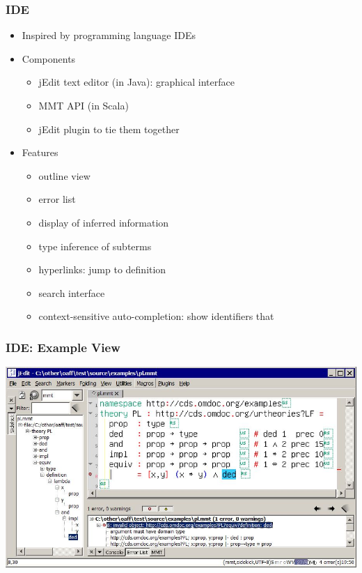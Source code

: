 \documentclass{beamer}
\begin{document}
\begin{frame}\frametitle{IDE}
 \begin{itemize}
   \item Inspired by programming language IDEs
   \item Components
     \begin{itemize}
       \item jEdit text editor (in Java): graphical interface
       \item MMT API (in Scala)
       \item jEdit plugin to tie them together
     \end{itemize}
   \item Features
     \begin{itemize}
       \item outline view
       \item error list
       \item display of inferred information
       \item type inference of subterms
       \item hyperlinks: jump to definition
       \item search interface
       \item context-sensitive auto-completion: show identifiers that
     \end{itemize}
\end{itemize}
\end{frame}

\begin{frame}\frametitle{IDE: Example View}
\includegraphics[width=\textwidth]{img/jedit-sidebar-errors.jpg}
\end{frame}
\end{document}
